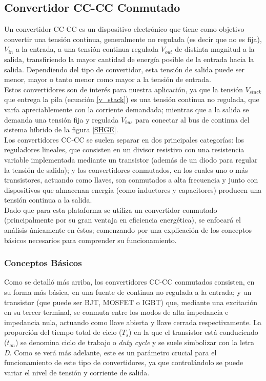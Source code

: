 \subsection{Convertidor CC-CC Conmutado}

Un convertidor CC-CC es un dispositivo electrónico que tiene como objetivo convertir una tensión continua, generalmente no regulada (es decir que no es fija), $V_{in}$ a la entrada, a una tensión continua regulada $V_{out}$ de distinta magnitud a la salida, transfiriendo la mayor cantidad de energía posible de la entrada hacia la salida. Dependiendo del tipo de convertidor, esta tensión de salida puede ser menor, mayor o tanto menor como mayor a la tensión de entrada.\\

Estos convertidores son de interés para nuestra aplicación, ya que la tensión $V_{stack}$ que entrega la pila (ecuación \ref{v_stack}) es una tensión continua no regulada, que varía apreciablemente con la corriente demandada; mientras que a la salida se demanda una tensión fija y regulada $V_{bus}$ para conectar al bus de continua del sistema híbrido de la figura \ref{SHGE}.\\

Los convertidores CC-CC se suelen separar en dos principales categorías: los {\Medium reguladores lineales}, que consisten en un divisor resistivo con una resistencia variable implementada mediante un transistor (además de un diodo para regular la tensión de salida); y los {\Medium convertidores conmutados}, en los cuales uno o más transistores, actuando como llaves, son conmutados a alta frecuencia y junto con dispositivos que almacenan energía (como inductores y capacitores) producen una tensión continua a la salida.\\

Dado que para esta plataforma se utiliza un convertidor conmutado (principalmente por su gran ventaja en eficiencia energética), se enfocará el análisis únicamente en éstos; comenzando por una explicación de los conceptos básicos necesarios para comprender su funcionamiento.\\

\subsubsection{Conceptos Básicos}

Como se detalló más arriba, los convertidores CC-CC conmutados consisten, en su forma más básica, en una fuente de continua no regulada a la entrada; y un transistor (que puede ser BJT, MOSFET o IGBT) que, mediante una excitación en su tercer terminal, se conmuta entre los modos de alta impedancia e impedancia nula, actuando como llave abierta y llave cerrada respectivamente. La proporción del tiempo total de ciclo ($T_s$) en la que el transistor está conduciendo ($t_{on}$) se denomina {\Medium ciclo de trabajo} o {\Medium \textit{duty cycle}} y se suele simbolizar con la {\Medium letra \textit{D}}. Como se verá más adelante, este es un parámetro crucial para el funcionamiento de este tipo de convertidores, ya que controlándolo se puede variar el nivel de tensión y corriente de salida.\\

